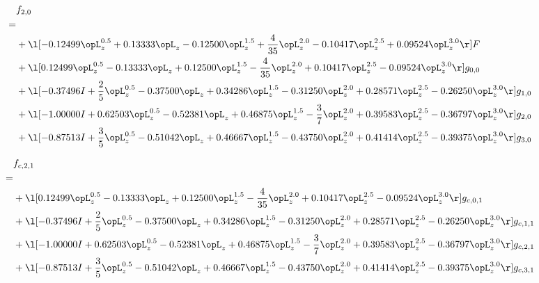\begin{alignat}{2} 
\label{eq:f_20_0} 
& f_{2,0} \nonumber \\ 
 = \\ 
& + \l[  -0.12499 \opL_z^{0.5} +  0.13333 \opL_z   -0.12500 \opL_z^{1.5} + \frac{4}{35} \opL_z^{2.0}   -0.10417 \opL_z^{2.5} +  0.09524 \opL_z^{3.0}  \r] F \nonumber \\ 
& + \l[  0.12499 \opL_z^{0.5}   -0.13333 \opL_z +  0.12500 \opL_z^{1.5} - \frac{4}{35} \opL_z^{2.0} +  0.10417 \opL_z^{2.5}   -0.09524 \opL_z^{3.0}  \r] g_{0,0} \nonumber \\ 
& + \l[  -0.37496 I + \frac{2}{5} \opL_z^{0.5}   -0.37500 \opL_z +  0.34286 \opL_z^{1.5}   -0.31250 \opL_z^{2.0} +  0.28571 \opL_z^{2.5}   -0.26250 \opL_z^{3.0}  \r] g_{1,0} \nonumber \\ 
& + \l[  -1.00000 I +  0.62503 \opL_z^{0.5}   -0.52381 \opL_z +  0.46875 \opL_z^{1.5} - \frac{3}{7} \opL_z^{2.0} +  0.39583 \opL_z^{2.5}   -0.36797 \opL_z^{3.0}  \r] g_{2,0} \nonumber \\ 
& + \l[  -0.87513 I + \frac{3}{5} \opL_z^{0.5}   -0.51042 \opL_z +  0.46667 \opL_z^{1.5}   -0.43750 \opL_z^{2.0} +  0.41414 \opL_z^{2.5}   -0.39375 \opL_z^{3.0}  \r] g_{3,0} \nonumber \\ 
\end{alignat} 


\begin{alignat}{2} 
\label{eq:f_21_0} 
& f_{c,2,1} \nonumber \\ 
 = \\ 
& + \l[  0.12499 \opL_z^{0.5}   -0.13333 \opL_z +  0.12500 \opL_z^{1.5} - \frac{4}{35} \opL_z^{2.0} +  0.10417 \opL_z^{2.5}   -0.09524 \opL_z^{3.0}  \r] g_{c,0,1} \nonumber \\ 
& + \l[  -0.37496 I + \frac{2}{5} \opL_z^{0.5}   -0.37500 \opL_z +  0.34286 \opL_z^{1.5}   -0.31250 \opL_z^{2.0} +  0.28571 \opL_z^{2.5}   -0.26250 \opL_z^{3.0}  \r] g_{c,1,1} \nonumber \\ 
& + \l[  -1.00000 I +  0.62503 \opL_z^{0.5}   -0.52381 \opL_z +  0.46875 \opL_z^{1.5} - \frac{3}{7} \opL_z^{2.0} +  0.39583 \opL_z^{2.5}   -0.36797 \opL_z^{3.0}  \r] g_{c,2,1} \nonumber \\ 
& + \l[  -0.87513 I + \frac{3}{5} \opL_z^{0.5}   -0.51042 \opL_z +  0.46667 \opL_z^{1.5}   -0.43750 \opL_z^{2.0} +  0.41414 \opL_z^{2.5}   -0.39375 \opL_z^{3.0}  \r] g_{c,3,1} \nonumber \\ 
\end{alignat} 


